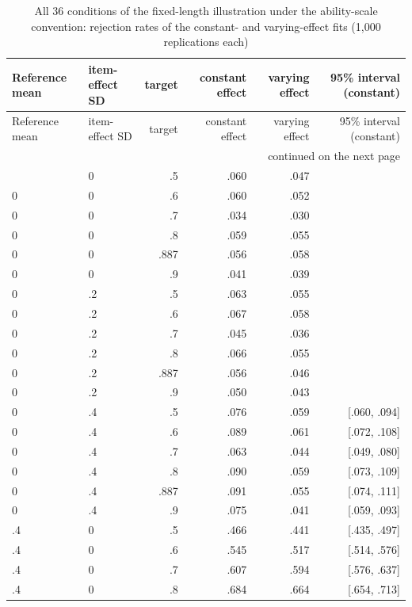 \begingroup\footnotesize{}\setlength{\tabcolsep}{3.5pt}
\begin{longtable}{llrrrr}
\caption{All 36 conditions of the fixed-length illustration under the ability-scale convention: rejection rates of the constant- and varying-effect fits (1,000 replications each)}\label{tab:arm-a-all}\\
\toprule
Reference mean & item-effect SD & target & constant effect & varying effect & 95\% interval (constant) \\
\midrule
\endfirsthead
\toprule
Reference mean & item-effect SD & target & constant effect & varying effect & 95\% interval (constant) \\
\midrule
\endhead
\midrule\multicolumn{6}{r}{\footnotesize continued on the next page}\\
\endfoot
\bottomrule
\endlastfoot
0 & 0 & .5 & .060 & .047 &  \\
0 & 0 & .6 & .060 & .052 &  \\
0 & 0 & .7 & .034 & .030 &  \\
0 & 0 & .8 & .059 & .055 &  \\
0 & 0 & .887 & .056 & .058 &  \\
0 & 0 & .9 & .041 & .039 &  \\
0 & .2 & .5 & .063 & .055 &  \\
0 & .2 & .6 & .067 & .058 &  \\
0 & .2 & .7 & .045 & .036 &  \\
0 & .2 & .8 & .066 & .055 &  \\
0 & .2 & .887 & .056 & .046 &  \\
0 & .2 & .9 & .050 & .043 &  \\
0 & .4 & .5 & .076 & .059 & [.060, .094] \\
0 & .4 & .6 & .089 & .061 & [.072, .108] \\
0 & .4 & .7 & .063 & .044 & [.049, .080] \\
0 & .4 & .8 & .090 & .059 & [.073, .109] \\
0 & .4 & .887 & .091 & .055 & [.074, .111] \\
0 & .4 & .9 & .075 & .041 & [.059, .093] \\
.4 & 0 & .5 & .466 & .441 & [.435, .497] \\
.4 & 0 & .6 & .545 & .517 & [.514, .576] \\
.4 & 0 & .7 & .607 & .594 & [.576, .637] \\
.4 & 0 & .8 & .684 & .664 & [.654, .713] \\

\end{longtable}

